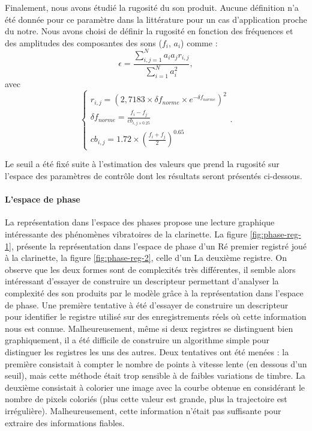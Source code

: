 \documentclass[french, twocolumn]{article}
\begin{document}
Finalement, nous avons étudié la rugosité du son produit. Aucune définition n'a été donnée pour ce paramètre dans la littérature pour un cas d'application proche du notre. Nous avons choisi de définir la rugosité en fonction des fréquences et des amplitudes des composantes des sons ($f_i$, $a_i$) comme \cite{pressnitzer1998perception}: 
\begin{equation}
    \epsilon = \frac{\sum_{i,j =1}^{N}a_ia_jr_{i,j}}{\sum_{i=1}^{N}a_{i}^{2}}, 
\end{equation}
avec 
\begin{equation*} 
\begin{cases}
    r_{i,j} = (2,7183 \times \delta f_{norme} \times e^{-\delta f_{norme}})^2\\
    \delta f_{norme} = \frac{f_i-f_j}{cb_{i,j \times 0.25}}\\
    cb_{i,j} = 1.72 \times (\frac{f_i+f_j}{2})^{0.65} 
\end{cases}.
\end{equation*}

Le seuil a été fixé suite à l'estimation des valeurs que prend la rugosité sur l'espace des paramètres de contrôle dont les résultats seront présentés ci-dessous. 

\paragraph{L'espace de phase}\label{par:espace de phase}

La représentation dans l'espace des phases propose une lecture graphique intéressante des phénomènes vibratoires de la clarinette. La figure \ref{fig:phase-reg-1}, présente la représentation dans l'espace de phase d'un Ré premier registré joué à la clarinette, la figure \ref{fig:phase-reg-2}, celle d'un La deuxième registre. On observe que les deux formes sont de complexités très différentes, il semble alors intéressant d'essayer de construire un descripteur permettant d'analyser la complexité des son produits par le modèle grâce à la représentation dans l'espace de phase. 
Une première tentative à été d'essayer de construire un descripteur pour identifier le registre utilisé sur des enregistrements réels où cette information nous est connue. 
Malheureusement, même si deux registres se distinguent bien graphiquement, il a été difficile de construire un algorithme simple pour distinguer les registres les uns des autres. Deux tentatives ont été menées : la première consistait à compter le nombre de points à vitesse lente (en dessous d'un seuil), mais cette méthode était trop sensible à de faibles variations de timbre. La deuxième consistait à colorier une image avec la courbe obtenue en considérant le nombre de pixels coloriés (plus cette valeur est grande, plus la trajectoire est irrégulière). Malheureusement, cette information n'était pas suffisante pour extraire des informations fiables.
\end{document}
